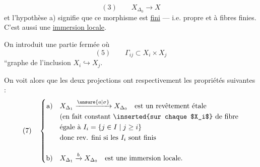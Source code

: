 \[
(3)\qquad X_{\Delta_0}\longrightarrow X
\]
et l'hypothèse a) signifie que ce
morphisme  est \uline{fini} --- i.e. propre
 et à fibres finies. C'est aussi une
\uline{immersion locale}.

On introduit une partie fermée
où
\[
(5)\qquad \Gamma_{ij}\subset X_i\times X_j
\]
``graphe de l'inclusion $X_i\hookrightarrow X_j$.

On voit alors que les deux projections
ont respectivement les propriétés suivantes :
\[
(7)\quad\left\{\begin{aligned}
\text{a)}\quad &X_{\Delta_1}\xrightarrow{\unsure{a|\sigma}}X_{\Delta_0}\quad\text{est un revêtement étale}\\
&\text{(en fait constant \inserted{sur chaque $X_i$} de fibre}\\
&\text{égale à }I_i=\{j\in I\mid j\geq i\}\\
&\text{donc rev. fini si les }I_i\text{ sont finis}\\[1em]
\text{b)}\quad &X_{\Delta_1}\xrightarrow{b}X_{\Delta_0}\quad\text{est une immersion locale.}
\end{aligned}\right.
\]
